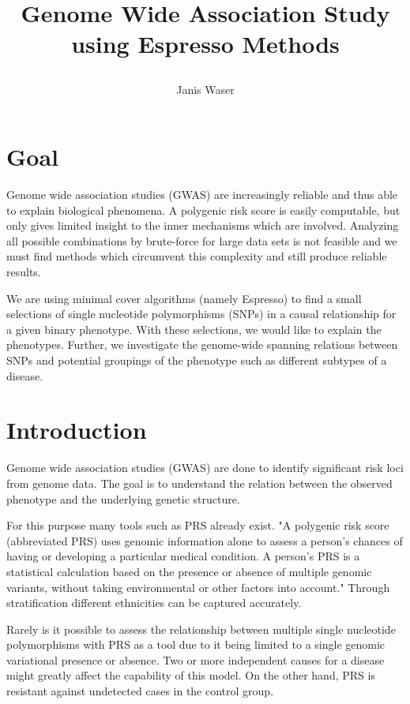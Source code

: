 \documentclass[letterpaper, 11pt]{article}
\title{	

Genome Wide Association Study using Espresso Methods
}
\author{ Janis Waser}
\begin{document}
\maketitle




\section{Goal}
\label{sec:goal}
Genome wide association studies  (GWAS) are increasingly reliable and thus able to explain biological phenomena. A polygenic risk score is easily computable, but only gives limited insight to the inner mechanisms which are involved. Analyzing all possible combinations by brute-force for large data sets is not feasible and we must find methods which circumvent this complexity and still produce reliable results.

We are using minimal cover algorithms (namely Espresso) to find a small selections of single nucleotide polymorphisms (SNPs) in a causal relationship for a given binary phenotype.  With these selections, we would like to explain the phenotypes.  Further, we investigate the genome-wide spanning relations between SNPs and potential groupings of the phenotype such as different subtypes of a disease. 


\tableofcontents
\newpage
\section{Introduction}
Genome wide association studies  (GWAS)  are done to identify significant risk loci from genome data. The goal is to understand the relation between the observed phenotype and the underlying genetic structure. 

For this purpose many tools such as PRS already exist. "A polygenic risk score (abbreviated PRS) uses genomic information alone to assess a person’s chances of having or developing a particular medical condition. A person’s PRS is a statistical calculation based on the presence or absence of multiple genomic variants, without taking environmental or other factors into account."\cite{prs} Through stratification different ethnicities can be captured accurately. 

Rarely is it possible to assess the relationship between multiple single nucleotide polymorphisms with PRS as a tool due to it being limited to a single genomic variational presence or absence. Two or more independent causes for a disease might greatly affect the capability of this model. On the other hand, PRS is resistant against undetected cases in the control group. 
\end{document}
